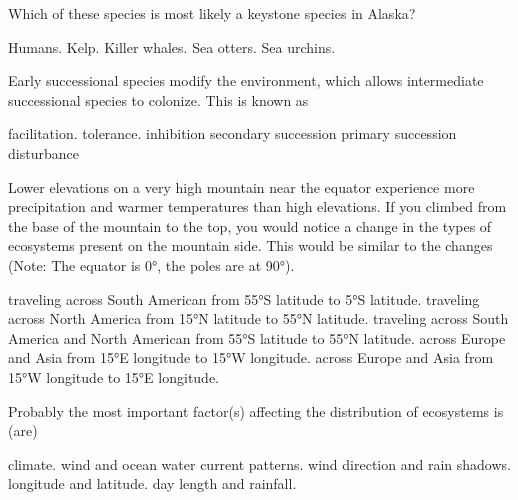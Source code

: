 \question
Which of these species is most likely a keystone species in Alaska?

\begin{choices}
	\choice Humans.  %
	\choice Kelp.  %
	\choice Killer whales. %
	\correctchoice Sea otters. %
	\choice Sea urchins.  %
\end{choices}



\question
Early successional species modify the environment, which allows intermediate successional species to colonize. This is known as

\begin{choices}
\correctchoice facilitation. %
\choice tolerance. %
\choice inhibition %
\choice secondary succession %
\choice primary succession %
\choice disturbance %
\end{choices}



\question
Lower elevations on a very high mountain near the equator experience more precipitation and warmer temperatures than high elevations. If you climbed from the base of the mountain to the top, you would notice a change in the types of ecosystems present on the mountain side. This would be similar to the changes (Note: The equator is 0°, the poles are at 90°). 

\begin{choices}
\choice traveling across South American from 55°S latitude to 5°S latitude.%
\correctchoice traveling across North America from 15°N latitude to 55°N latitude.%
\choice traveling across South America and North American from 55°S latitude to 55°N latitude.%
\choice across Europe and Asia from 15°E longitude to 15°W longitude.%
\choice across Europe and Asia from 15°W longitude to 15°E longitude.%
\end{choices}

\question
Probably the most important factor(s) affecting the distribution of ecosystems is (are)

\begin{choices}
\correctchoice climate.%
\choice wind and ocean water current patterns.%
\choice wind direction and rain shadows.%
\choice longitude and latitude.%
\choice day length and rainfall.%
\end{choices}


